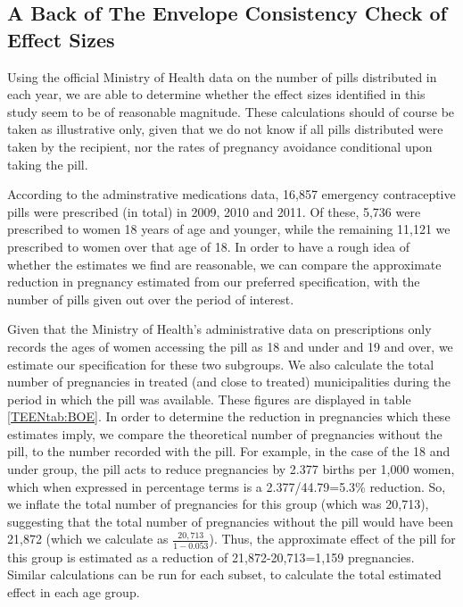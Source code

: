 \documentclass[11pt,subeqn]{article}
\begin{document}
\begin{spacing}{1.4}
\section{A Back of The Envelope Consistency Check of Effect Sizes}
\label{TEENscn:BOE}
Using the official Ministry of Health data on the number of pills distributed
in each year, we are able to determine whether the effect sizes identified in
this study seem to be of reasonable magnitude.  These calculations should of
course be taken as illustrative only, given that we do not know if all pills
distributed were taken by the recipient, nor the rates of pregnancy avoidance
conditional upon taking the pill.

According to the adminstrative medications data, 16,857 emergency 
contraceptive pills were prescribed (in total) in 2009, 2010 and 2011. Of 
these, 5,736 were prescribed to women 18 years of age and younger, while the
remaining 11,121 we prescribed to women over that age of 18.  In order to have
a rough idea of whether the estimates we find are reasonable, we can compare
the approximate reduction in pregnancy estimated from our preferred 
specification, with the number of pills given out over the period of interest.

Given that the Ministry of Health's administrative data on prescriptions only
records the ages of women accessing the pill as 18 and under and 19 and over,
we estimate our specification for these two subgroups.  We also
calculate the total number of pregnancies in treated (and close to treated)
municipalities during the period in which the pill was available.  These 
figures are displayed in table \ref{TEENtab:BOE}.  In order to determine the
reduction in pregnancies which these estimates imply, we compare the 
theoretical number of pregnancies without the pill, to the number recorded 
with the pill.  For example, in the case of the 18 and under group, the pill acts 
to reduce pregnancies by 2.377 births per 1,000 women, which when expressed in
percentage terms is a 2.377/44.79=5.3\% reduction.  So, we inflate the 
total number of pregnancies for this group (which was 20,713), suggesting that 
the total number of pregnancies without the pill would have been 21,872 (which
we calculate as $\frac{20,713}{1-0.053}$).  Thus, the approximate effect of the 
pill for this group is estimated as a reduction of 21,872-20,713=1,159
pregnancies.  Similar calculations can be run for each subset, to calculate the
total estimated effect in each age group.


\end{spacing}
\end{document}
